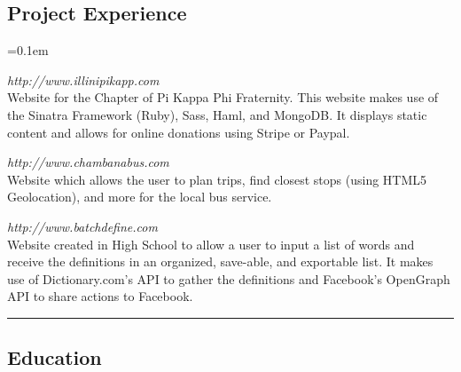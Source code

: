 \documentclass[10pt,letterpaper]{article}
\begin{document}
\subsection*{Project Experience}
\begin{description}[leftmargin=0pt]
	\parskip=0.1em
      
      \item[Pi Kappa Phi Illinois Chapter] {\emph{http://www.illinipikapp.com}}\hfill\\
      Website for the Chapter of Pi Kappa Phi Fraternity. This website makes use of the
      Sinatra Framework (Ruby), Sass, Haml, and MongoDB. It displays static 
      content and allows for online donations using Stripe or Paypal.
      
	\item[Chambana Bus] {\emph{http://www.chambanabus.com}}\hfill\\
      Website which allows the user to plan trips, find closest stops (using HTML5 
	Geolocation), and more for the local bus service.

	\item[BatchDefine] {\emph{http://www.batchdefine.com}}\hfill\\
      Website created in High School to allow a user to input a list of words 
      and receive the definitions in an organized, save-able, and exportable list. 
      It makes use of Dictionary.com's API to gather the definitions and 
      Facebook's OpenGraph API to share actions to Facebook.

	
\end{description}

\hrule
\vspace{-0.4em}
\subsection*{Education}
\end{document}
